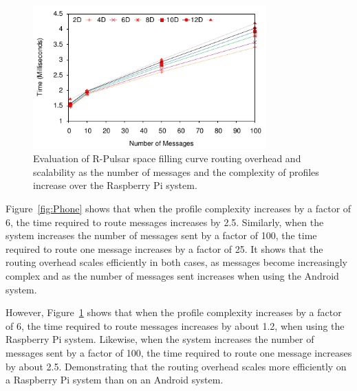 \begin{figure}[h!]
  \centering
  \includegraphics[width=0.8\textwidth]{Results/Raspberry}
  \caption{Evaluation of R-Pulsar space filling curve routing overhead and scalability as the number of messages and the complexity of profiles increase over the Raspberry Pi system.}
  \label{fig:Raspberri}
\end{figure}

Figure~\ref{fig:Phone} shows that when the profile complexity increases by a factor of 6, the time required to route messages increases by 2.5. Similarly, when the system increases the number of messages sent by a factor of 100, the time required to route one message increases by a factor of 25. It shows that the routing overhead scales efficiently in both cases, as messages become increasingly complex and as the number of messages sent increases when using the Android system. 

However, Figure~\ref{fig:Raspberri} shows that when the profile complexity increases by a factor of 6, the time required to route messages increases by about 1.2, when using the Raspberry Pi system. Likewise, when the system increases the number of messages sent by a factor of 100, the time required to route one message increases by about 2.5. Demonstrating that the routing overhead scales more efficiently on a Raspberry Pi system than on an Android system.
\vspace{1ex}




